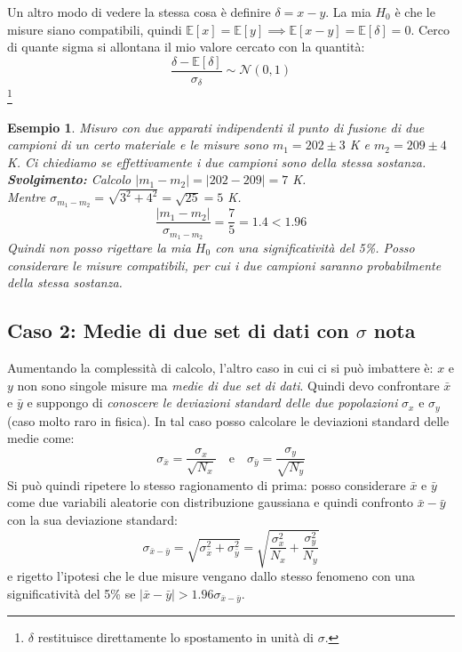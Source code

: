 \documentclass[openany,a4paper,12pt]{book}
\newtheorem{esempio}{Esempio}
\theoremstyle{remark}
\begin{document}
Un altro modo di vedere la stessa cosa è definire $\delta = x-y$. La mia $H_0$ è che le misure siano compatibili, quindi $\mathbb{E}[x] = \mathbb{E}[y] \implies \mathbb{E}[x-y] = \mathbb{E}[\delta] = 0$. 
Cerco di quante sigma si allontana il mio valore cercato con la quantità:
\begin{equation}
    \frac{\delta - \mathbb{E}[\delta]}{\sigma_\delta} \sim \mathcal{N}(0,1)
\end{equation}\footnote{$\delta$ restituisce direttamente lo spostamento in unità di $\sigma$.}

\begin{esempio}
Misuro con due apparati indipendenti il punto di fusione di due campioni di un certo materiale e le misure sono $m_1 = 202 \pm 3$ K e $m_2 = 209 \pm 4$ K. Ci chiediamo se effettivamente i due campioni sono della stessa sostanza. \\
\textbf{Svolgimento:} Calcolo $|m_1 - m_2| = |202 - 209| = 7$ K. \\
Mentre $\sigma_{m_1-m_2} = \sqrt{3^2 + 4^2} = \sqrt{25} = 5$ K.
$$ \frac{|m_1-m_2|}{\sigma_{m_1-m_2}} = \frac{7}{5} = 1.4 < 1.96 $$
Quindi non posso rigettare la mia $H_0$ con una significatività del 5\%. Posso considerare le misure compatibili, per cui i due campioni saranno probabilmente della stessa sostanza.
\end{esempio}

\subsection*{Caso 2: Medie di due set di dati con $\sigma$ nota}
Aumentando la complessità di calcolo, l'altro caso in cui ci si può imbattere è: $x$ e $y$ non sono singole misure ma \textit{medie di due set di dati}. Quindi devo confrontare $\bar{x}$ e $\bar{y}$ e suppongo di \textit{conoscere le deviazioni standard delle due popolazioni} $\sigma_x$ e $\sigma_y$ (caso molto raro in fisica). 
In tal caso posso calcolare le deviazioni standard delle medie come:
$$ \sigma_{\bar{x}} = \frac{\sigma_x}{\sqrt{N_x}} \quad \text{e} \quad \sigma_{\bar{y}} = \frac{\sigma_y}{\sqrt{N_y}} $$
Si può quindi ripetere lo stesso ragionamento di prima: posso considerare $\bar{x}$ e $\bar{y}$ come due variabili aleatorie con distribuzione gaussiana e quindi confronto $\bar{x}-\bar{y}$ con la sua deviazione standard:
$$ \sigma_{\bar{x}-\bar{y}} = \sqrt{\sigma_{\bar{x}}^2 + \sigma_{\bar{y}}^2} = \sqrt{\frac{\sigma_x^2}{N_x} + \frac{\sigma_y^2}{N_y}} $$
e rigetto l'ipotesi che le due misure vengano dallo stesso fenomeno con una significatività del 5\% se $|\bar{x}-\bar{y}| > 1.96 \sigma_{\bar{x}-\bar{y}}$.
\end{document}
